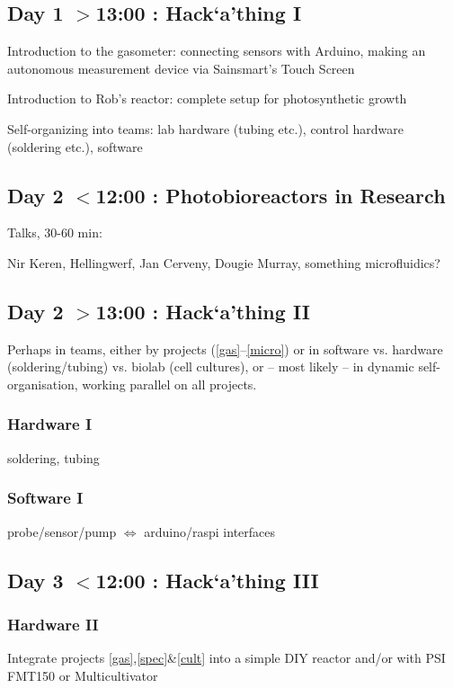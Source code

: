 \documentclass[12pt,a4paper]{scrartcl}
\begin{document}
\subsection{Day 1 $>$13:00 : Hack`a'thing I}

Introduction to the gasometer: connecting sensors with Arduino,
making an autonomous measurement device via Sainsmart's Touch Screen

Introduction to Rob's reactor: complete setup for photosynthetic growth

Self-organizing into teams: lab hardware (tubing etc.), control hardware
(soldering etc.), software

\subsection{Day 2 $<$12:00 : Photobioreactors in Research}

Talks, 30-60 min:

Nir Keren, Hellingwerf, Jan Cerveny, Dougie Murray,
something microfluidics?

\subsection{Day 2 $>$13:00 : Hack`a'thing II}

Perhaps in teams, either by projects (\ref{gas}--\ref{micro}) or in
software vs. hardware (soldering/tubing) vs. biolab (cell cultures),
or -- most likely -- in dynamic self-organisation, working parallel on
all projects.

\subsubsection{Hardware I} 
soldering, tubing

\subsubsection{Software I} 
probe/sensor/pump $\Leftrightarrow$ arduino/raspi interfaces

\subsection{Day 3 $<$12:00 : Hack`a'thing III}

\subsubsection{Hardware II} 
Integrate projects \ref{gas},\ref{spec}\&\ref{cult} into a simple DIY
reactor and/or with PSI FMT150 or Multicultivator
\end{document}
